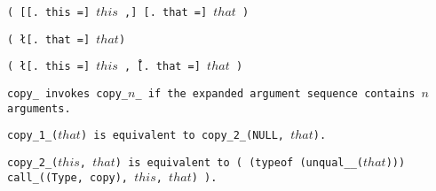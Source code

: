 
\s\s\s\tt{(} [[\tt{. this =}]
$this$ \tt{,}] [\tt{. that =}] $that$ \tt{)}

\s\tt{(} \l[\tt{. that =}] $that$\r \tt{)}

\s\tt{(} \l[\tt{. this =}]
$this$ \tt{,}\r\ [\tt{. that =}] $that$ \tt{)}


\tt{copy_} invokes \tt{copy_}$n$\_ if the expanded
argument sequence contains $n$ arguments.

\tt{copy_1_(}$that$\tt{)} is equivalent to \tt{copy_2_(NULL,} $that$\tt{)}.

\tt{copy_2_(}$this$\tt{,} $that$\tt{)} is equivalent to \tt{( (typeof
(unqual__(}$that$\tt{))) call_((Type, copy),} $this$\tt{,} $that$\tt{) )}.
